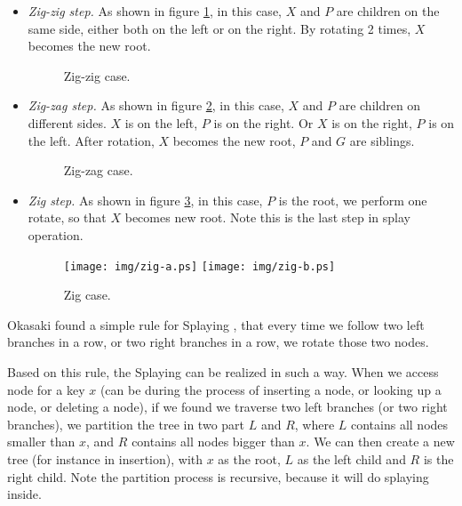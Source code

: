 \documentclass{article}
\begin{document}
\begin{itemize}
\item {\em Zig-zig step.} As shown in figure \ref{fig:zig-zig}, in this case,
$X$ and $P$ are children on the same side, either both on the left or on the right. By
rotating 2 times, $X$ becomes the new root.

\begin{figure}[htbp]
  \centering
  \caption{Zig-zig case.} \label{fig:zig-zig}
\end{figure}

\item {\em Zig-zag step.} As shown in figure \ref{fig:zig-zag}, in this
case, $X$ and $P$ are children on different sides. $X$ is on the left,
$P$ is on the right. Or $X$ is on the right, $P$ is on the left.
After rotation, $X$ becomes the new root, $P$ and $G$ are siblings.

\begin{figure}[htbp]
  \centering
  \caption{Zig-zag case.} \label{fig:zig-zag}
\end{figure}

\item {\em Zig step.} As shown in figure \ref{fig:zig}, in this case,
$P$ is the root, we perform one rotate, so that $X$ becomes new root.
Note this is the last step in splay operation.

\begin{figure}[htbp]
   \begin{center}
   	  \texttt{[image: img/zig-a.ps]}
          \texttt{[image: img/zig-b.ps]}
          \caption{Zig case.} \label{fig:zig}
   \end{center}
\end{figure}

\end{itemize}

Okasaki found a simple rule for Splaying \cite{okasaki-book},
that every time we follow
two left branches in a row, or two right branches in a row, we rotate
those two nodes.

Based on this rule, the Splaying can be realized in such a way.
When we access node for a key $x$ (can be during the process of
inserting a node, or looking up a node, or deleting a node), if
we found we traverse two left branches (or two right branches), we
partition the tree in two part $L$ and $R$, where $L$ contains all
nodes smaller than $x$, and $R$ contains all nodes bigger than $x$.
We can then create a new tree (for instance in insertion),
with $x$ as the root, $L$ as the left child and $R$ is the right child.
Note the partition process is recursive, because it will do splaying
inside.
\end{document}
